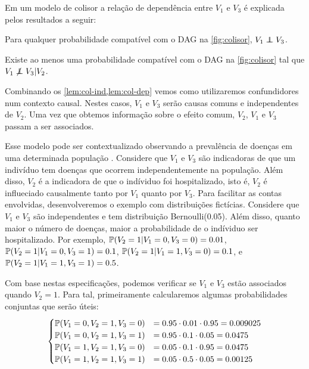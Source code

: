 Em um modelo de colisor 
a relação de dependência entre 
$V_1$ e $V_3$ é explicada pelos
resultados a seguir:

\begin{lemma}
 \label{lem:col-ind}
 Para qualquer probabilidade compatível com 
 o DAG na \cref{fig:colisor},
 $V_1 \ind V_3$.
\end{lemma}

\begin{lemma}
 \label{lem:col-dep}
 Existe ao menos uma probabilidade compatível com
 o DAG na \cref{fig:colisor} tal que
 $V_1 \not\ind V_3 | V_2$.
\end{lemma}

Combinando os \cref{lem:col-ind,lem:col-dep} vemos 
como utilizaremos confundidores num contexto causal.
Nestes casos, $V_1$ e $V_3$ serão causas comuns e independentes de $V_2$.
Uma vez que obtemos informação sobre o efeito comum, $V_2$,
$V_1$ e $V_3$ passam a ser associados.

Esse modelo pode ser contextualizado observando
a prevalência de doenças em uma determinada população 
\citep{Sackett1979}.
Considere que  $V_1$ e $V_3$ são 
indicadoras de que um indivíduo tem
doenças que ocorrem independentemente na população.
Além disso, $V_2$ é a indicadora de que 
o indíviduo foi hospitalizado, isto é,
$V_2$ é influeciado causalmente 
tanto por $V_1$ quanto por $V_3$.
Para facilitar as contas envolvidas,
desenvolveremos o exemplo com distribuições fictícias.
Considere que
$V_1$ e $V_3$ são independentes e
tem distribuição Bernoulli(0.05).
Além disso, quanto maior o número de doenças,
maior a probabilidade de o indíviduo ser hospitalizado.
Por exemplo,
$\P(V_2=1|V_1=0,V_3=0) = 0.01$,
$\P(V_2=1|V_1=0,V_3=1) = 0.1$,
$\P(V_2=1|V_1=1,V_3=0) = 0.1$, e
$\P(V_2=1|V_1=1,V_3=1) = 0.5$.

Com base nestas especificações, podemos
verificar se $V_1$ e $V_3$ estão associados
quando $V_2=1$. Para tal,
primeiramente calcularemos algumas
probabilidades conjuntas que serão úteis:
\begin{align}
 \label{eq:ex-col-1}
 \begin{cases}
  \P(V_1=0,V_2=1,V_3=0) &= 0.95 \cdot 0.01 \cdot 0.95 = 0.009025 \\
  \P(V_1=0,V_2=1,V_3=1) &= 0.95 \cdot 0.1 \cdot 0.05 = 0.0475 \\
  \P(V_1=1,V_2=1,V_3=0) &= 0.05 \cdot 0.1 \cdot 0.95 = 0.0475 \\
  \P(V_1=1,V_2=1,V_3=1) &= 0.05 \cdot 0.5 \cdot 0.05 = 0.00125
 \end{cases}
\end{align}

